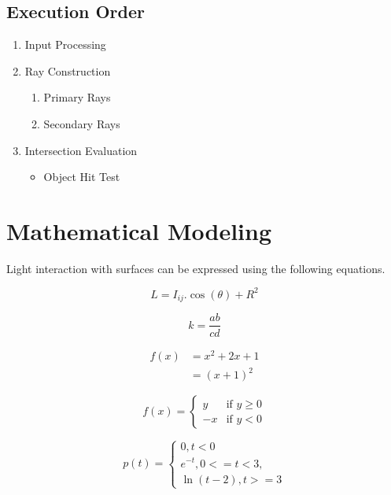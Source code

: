 \documentclass{article}
\begin{document}
\subsection{Execution Order}
\begin{enumerate}
    \item Input Processing
    \item Ray Construction
        \begin{enumerate}
            \item[(a)]Primary Rays
            \item[(a)] Secondary Rays
        \end{enumerate}
    \item  Intersection Evaluation
        \begin{itemize}
            \item Object Hit Test
        \end{itemize}
\end{enumerate}

\section{Mathematical Modeling}
Light interaction with surfaces can be expressed using the following equations.

\begin{equation}
    L = I_{ij}.\cos (\theta) + R^2
\end{equation}

$$
k = \frac{ab}{cd}
$$

\begin{equation}
\begin{split}
    f(x) &= x^2 + 2x + 1 \\
    &= (x + 1)^2
\end{split}
\end{equation}

\[
f(x) = \begin{cases}
    y & \text{if } y \geq 0 \\
    -x  & \text{if } y < 0
\end{cases}
\]

\[
p(t) = \begin{cases}
    0,  t < 0 \\
    e^{-t}, 0 <= t < 3, \\
    \ln (t - 2), t >= 3
\end{cases}
\]
\end{document}
